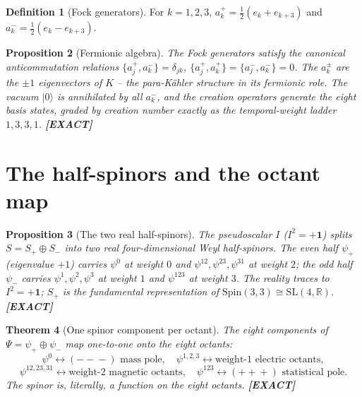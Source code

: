 \documentclass[11pt,oneside]{book}
\newcommand{\RR}{\mathbb{R}}
\newcommand{\Spin}{\mathrm{Spin}}
\newcommand{\status}[1]{{\sffamily\bfseries\color{statuscol}[#1]}}
\theoremstyle{plain}
\newtheorem{theorem}{Theorem}[chapter]
\newtheorem{proposition}[theorem]{Proposition}
\theoremstyle{definition}
\newtheorem{definition}[theorem]{Definition}
\theoremstyle{remark}
\begin{document}
\begin{definition}[Fock generators]
\label{def:fock}
For $k=1,2,3$, $a_k^{+}=\tfrac12(e_k+e_{k+3})$ and $a_k^{-}=\tfrac12(e_k-e_{k+3})$.
\end{definition}

\begin{proposition}[Fermionic algebra]
\label{prop:car}
The Fock generators satisfy the canonical anticommutation relations
$\{a_j^{+},a_k^{-}\}=\delta_{jk}$, $\{a_j^{+},a_k^{+}\}=\{a_j^{-},a_k^{-}\}=0$.
The $a_k^{\pm}$ are the $\pm1$ eigenvectors of $K$ -- the para-K\"ahler structure in
its fermionic role. The vacuum $|0\rangle$ is annihilated by all $a_k^{-}$, and the
creation operators generate the eight basis states, graded by creation number
exactly as the temporal-weight ladder $1,3,3,1$. \status{EXACT}
\end{proposition}

\section{The half-spinors and the octant map}
\label{sec:octant-map}

\begin{proposition}[The two real half-spinors]
\label{prop:halfspinors}
The pseudoscalar $I$ ($I^2=+\mathbf 1$) splits $S=S_+\oplus S_-$ into two real
four-dimensional Weyl half-spinors. The even half $\psi_+$ (eigenvalue $+1$) carries
$\psi^0$ at weight $0$ and $\psi^{12},\psi^{23},\psi^{31}$ at weight $2$; the odd
half $\psi_-$ carries $\psi^1,\psi^2,\psi^3$ at weight $1$ and $\psi^{123}$ at
weight $3$. The reality traces to $I^2=+\mathbf 1$; $S_+$ is the fundamental
representation of $\Spin(3,3)\cong\mathrm{SL}(4,\RR)$. \status{EXACT}
\end{proposition}

\begin{theorem}[One spinor component per octant]
\label{thm:octant-spinor}
The eight components of $\Psi=\psi_+\oplus\psi_-$ map one-to-one onto the eight
octants:
\[
  \psi^0\leftrightarrow(-\!-\!-)\text{ mass pole},\quad
  \psi^{1,2,3}\leftrightarrow\text{weight-1 electric octants},
\]
\[
  \psi^{12,23,31}\leftrightarrow\text{weight-2 magnetic octants},\quad
  \psi^{123}\leftrightarrow(+\!+\!+)\text{ statistical pole}.
\]
The spinor is, literally, a function on the eight octants. \status{EXACT}
\end{theorem}
\end{document}
